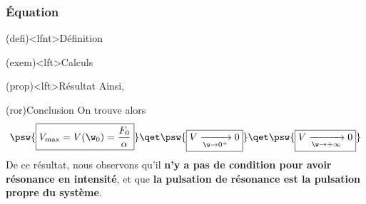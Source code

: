 \documentclass[../../main/main.tex]{subfiles}
\begin{document}
\subsubsection{Équation}

\begin{tcb}(defi)<lfnt>{\small Définition}
	\vspace{-15pt}
\end{tcb}
\begin{tcb}(exem)<lft>{Calculs}
	\vspace{-15pt}
\end{tcb}
\begin{tcb}(prop)<lft>{Résultat}
	Ainsi,
	\vspace{-15pt}
\end{tcb}
\begin{tcb}(ror){Conclusion}
	On trouve alors
	\[
		\psw{
			\boxed{
				V_{\max} = V(\w_0) = \frac{F_0}{\alpha}
			}
		}
		\qet
		\psw{
			\boxed{
				V\xrightarrow[\w\to0^+]{} 0
			}
		}
		\qet
		\psw{
			\boxed{
				V\xrightarrow[\w\to+\infty]{} 0
			}
		}
	\]
	De ce résultat, nous observons qu'il \textbf{n'y a pas de condition pour avoir
		résonance en intensité}, et que \textbf{la pulsation de résonance est la
		pulsation propre du système}.
\end{tcb}

\vspace{-15pt}
\end{document}
